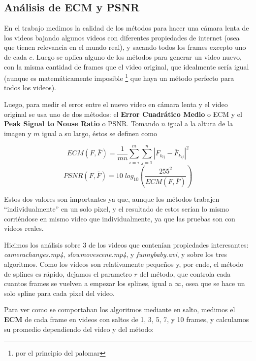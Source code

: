 \subsection {An\'alisis de ECM y PSNR}

En el trabajo medimos la calidad de los m\'etodos para hacer una c\'amara lenta
de los videos bajando algunos videos con diferentes propiedades de internet
(osea que tienen relevancia en el mundo real), y sacando todos los frames
excepto uno de cada $c$. Luego se aplica alguno de los m\'etodos para generar un
video nuevo, con la misma cantidad de frames que el video original, que
idealmente ser\'ia igual (aunque es matem\'aticamente imposible \footnote{por el
principio del palomar} que haya un m\'etodo perfecto para todos los videos).

Luego, para medir el error entre el nuevo video en c\'amara lenta y el video
original se usa uno de dos m\'etodos: el \textbf{Error Cuadr\'atico Medio} o ECM
y el \textbf{Peak Signal to Nouse Ratio} o PSNR. Tomando $n$ igual a la altura 
de la imagen y $m$ igual a su largo, \'estos se definen como

\[
ECM(F, \bar{F}) = \frac{1}{m n} \sum^m_{i = i} \sum^n_{j = 1} \left| F_{k_{i j}} - \bar{F}_{k_{i j}} \right|^2
\]
\[
PSNR(F, \bar{F}) = 10 \; log_{10} \left( \frac{255^2}{ECM(F, \bar{F})} \right)
\]

Estos dos valores son importantes ya que, aunque los m\'etodos trabajen
``individualmente'' en un solo pixel, y el resultado de estos ser\'ian lo mismo
corri\'endose en mismo video que individualmente, ya que las pruebas son con videos
reales.

Hicimos los an\'alisis sobre 3 de los videos que conten\'ian propiedades
interesantes: \textit{camerachanges.mp4}, \textit{slowmovescene.mp4}, y
\textit{funnybaby.avi}, y sobre los tres algoritmos. Como los videos son
relativamente peque\~nos y, por ende, el m\'etodo de splines es r\'apido,
dejamos el parametro $r$ del m\'etodo, que controla cada cuantos frames se
vuelven a empezar los splines, igual a $\infty$, osea que se hace un solo spline
para cada pixel del video.

Para ver como se comportaban los algoritmos mediante en salto, medimos el
\textbf{ECM} de cada frame en videos con saltos de 1, 3, 5, 7, y 10 frames, y
calculamos su promedio dependiendo del video y del m\'etodo:

